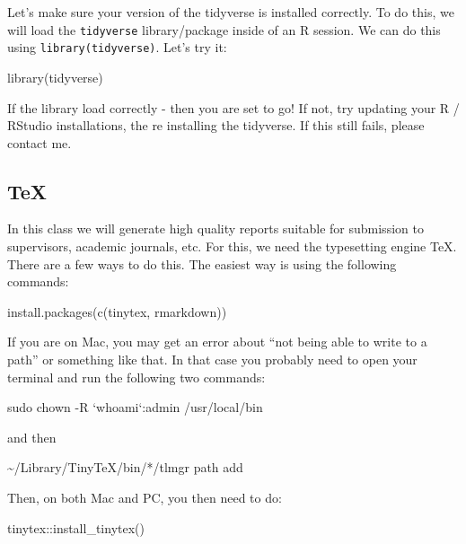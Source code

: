 \documentclass[
]{krantz}
\newenvironment{Shaded}{\begin{snugshade}}{\end{snugshade}}
\newcommand{\FunctionTok}[1]{\textcolor[rgb]{0.00,0.00,0.00}{#1}}
\newcommand{\NormalTok}[1]{#1}
\newcommand{\SpecialCharTok}[1]{\textcolor[rgb]{0.00,0.00,0.00}{#1}}
\newcommand{\StringTok}[1]{\textcolor[rgb]{0.31,0.60,0.02}{#1}}
\begin{document}
Let's make sure your version of the tidyverse is installed correctly. To do this, we will load the \texttt{tidyverse} library/package inside of an R session. We can do this using \texttt{library(tidyverse)}. Let's try it:

\begin{Shaded}
\begin{Highlighting}[]
\FunctionTok{library}\NormalTok{(tidyverse)}
\end{Highlighting}
\end{Shaded}

If the library load correctly - then you are set to go! If not, try updating your R / RStudio installations, the re installing the tidyverse. If this still fails, please contact me.

\hypertarget{tex}{%
\subsection{TeX}\label{tex}}

In this class we will generate high quality reports suitable for submission to supervisors, academic journals, etc. For this, we need the typesetting engine TeX. There are a few ways to do this. The easiest way is using the following commands:

\begin{Shaded}
\begin{Highlighting}[]
\FunctionTok{install.packages}\NormalTok{(}\FunctionTok{c}\NormalTok{(}\StringTok{\textquotesingle{}tinytex\textquotesingle{}}\NormalTok{, }\StringTok{\textquotesingle{}rmarkdown\textquotesingle{}}\NormalTok{))}
\end{Highlighting}
\end{Shaded}

If you are on Mac, you may get an error about ``not being able to write to a path'' or something like that. In that case you probably need to open your terminal and run the following two commands:

sudo chown -R `whoami`:admin /usr/local/bin

and then

\textasciitilde/Library/TinyTeX/bin/*/tlmgr path add

Then, on both Mac and PC, you then need to do:

\begin{Shaded}
\begin{Highlighting}[]
\NormalTok{tinytex}\SpecialCharTok{::}\FunctionTok{install\_tinytex}\NormalTok{()}
\end{Highlighting}
\end{Shaded}
\end{document}

